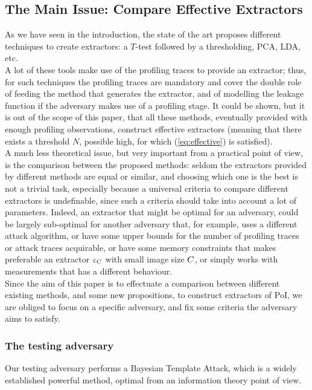 \subsection{The Main Issue:  Compare Effective Extractors}


As we have seen in the introduction, the state of the art proposes different techniques to create extractors:  a $T$-test followed by a thresholding, PCA, LDA, etc.\\
A lot of these tools make use of the profiling traces to provide an extractor; thus, for such techniques the profiling traces are mandatory and cover the double role of feeding the method that generates the extractor, and of modelling the leakage function if the adversary makes use of a profiling stage. It could be shown, but it is out of the scope of this paper, that all these methods, eventually provided with enough profiling observations, construct effective extractors (meaning that there exists a threshold $N$, possible high, for which (\ref{eq:effective}) is satisfied).\\

A much less theoretical issue, but very important from a practical point of view, is the comparison between the proposed methods: seldom the extractors provided by different methods are equal or similar, and choosing which one is the best is not a trivial task, especially because a universal criteria to compare different extractors is undefinable, since such a criteria should take into account a lot of parameters. Indeed, an extractor that might be optimal for an adversary, could be largely sub-optimal for another adversary that, for example, uses a different attack algorithm, or have some upper bounds for the number of profiling traces or attack traces acquirable, or have some memory constraints that makes preferable an extractor $\varepsilon_C$ with small image size $C$, or simply works with measurements that has a different behaviour. \\
Since the aim of this paper is to effectuate a comparison between different existing methods, and some new propositions, to construct extractors of PoI, we are obliged to focus on a specific adversary, and fix some criteria the adversary aims to satisfy. 
\subsubsection{The testing adversary} Our testing adversary performs a Bayesian Template Attack, which is a widely established powerful method, optimal from an information theory point of view. 


